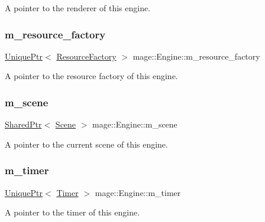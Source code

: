 A pointer to the renderer of this engine. \hypertarget{classmage_1_1_engine_a0c7c2d4fc75fc3512e02054056cf8a90}{}\label{classmage_1_1_engine_a0c7c2d4fc75fc3512e02054056cf8a90} 
\subsubsection{\texorpdfstring{m\+\_\+resource\+\_\+factory}{m\_resource\_factory}}
{\footnotesize\ttfamily \hyperlink{namespacemage_a8c307fbcc33bce9b7f2aa4c26c3b95cf}{Unique\+Ptr}$<$ \hyperlink{classmage_1_1_resource_factory}{Resource\+Factory} $>$ mage\+::\+Engine\+::m\+\_\+resource\+\_\+factory\hspace{0.3cm}{\ttfamily [private]}}

A pointer to the resource factory of this engine. \hypertarget{classmage_1_1_engine_a82158ab9c1b60538ef8c46d5eb263bb8}{}\label{classmage_1_1_engine_a82158ab9c1b60538ef8c46d5eb263bb8} 
\subsubsection{\texorpdfstring{m\+\_\+scene}{m\_scene}}
{\footnotesize\ttfamily \hyperlink{namespacemage_a1e01ae66713838a7a67d30e44c67703e}{Shared\+Ptr}$<$ \hyperlink{classmage_1_1_scene}{Scene} $>$ mage\+::\+Engine\+::m\+\_\+scene\hspace{0.3cm}{\ttfamily [private]}}

A pointer to the current scene of this engine. \hypertarget{classmage_1_1_engine_a4daac998928a6c087b310c52b3f26ae4}{}\label{classmage_1_1_engine_a4daac998928a6c087b310c52b3f26ae4} 
\subsubsection{\texorpdfstring{m\+\_\+timer}{m\_timer}}
{\footnotesize\ttfamily \hyperlink{namespacemage_a8c307fbcc33bce9b7f2aa4c26c3b95cf}{Unique\+Ptr}$<$ \hyperlink{classmage_1_1_timer}{Timer} $>$ mage\+::\+Engine\+::m\+\_\+timer\hspace{0.3cm}{\ttfamily [private]}}

A pointer to the timer of this engine. 